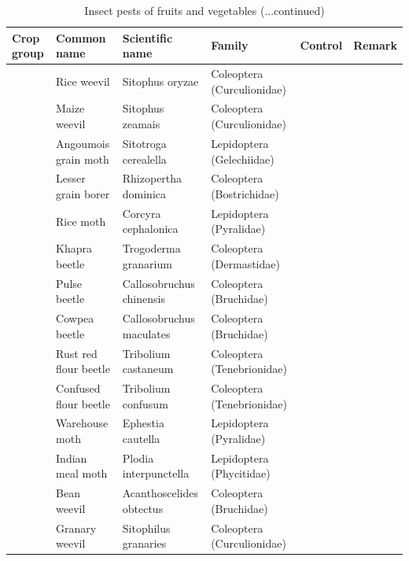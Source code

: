 \documentclass[10pt,dvipsnames,ignorenonframetext,aspectratio=169]{beamer}
\begin{document}
\begin{frame}{}
\protect\hypertarget{section-14}{}
\begin{table}

\caption{\label{tab:unnamed-chunk-2}Insect pests of fruits and vegetables (...continued)}
\centering
\fontsize{5}{7}\selectfont
\begin{tabular}[t]{>{\raggedright\arraybackslash}p{6em}>{\raggedright\arraybackslash}p{12em}>{\raggedright\arraybackslash}p{14em}>{\raggedright\arraybackslash}p{14em}>{\raggedright\arraybackslash}p{8em}>{\raggedright\arraybackslash}p{8em}}
\toprule
Crop group & Common name & Scientific name & Family & Control & Remark\\
\midrule
 & Rice weevil & Sitophus oryzae & Coleoptera (Curculionidae) &  & \\
\cmidrule{2-6}
 & Maize weevil & Sitophus zeamais & Coleoptera (Curculionidae) &  & \\
\cmidrule{2-6}
 & Angoumois grain moth & Sitotroga cerealella & Lepidoptera (Gelechiidae) &  & \\
\cmidrule{2-6}
 & Lesser grain borer & Rhizopertha dominica & Coleoptera (Bostrichidae) &  & \\
\cmidrule{2-6}
 & Rice moth & Corcyra cephalonica & Lepidoptera (Pyralidae) &  & \\
\cmidrule{2-6}
 & Khapra beetle & Trogoderma granarium & Coleoptera (Dermastidae) &  & \\
\cmidrule{2-6}
 & Pulse beetle & Callosobruchus chinensis & Coleoptera (Bruchidae) &  & \\
\cmidrule{2-6}
 & Cowpea beetle & Callosobruchus maculates & Coleoptera (Bruchidae) &  & \\
\cmidrule{2-6}
 & Rust red flour beetle & Tribolium castaneum & Coleoptera (Tenebrionidae) &  & \\
\cmidrule{2-6}
 & Confused flour beetle & Tribolium confusum & Coleoptera (Tenebrionidae) &  & \\
\cmidrule{2-6}
 & Warehouse moth & Ephestia cautella & Lepidoptera (Pyralidae) &  & \\
\cmidrule{2-6}
 & Indian meal moth & Plodia interpunctella & Lepidoptera (Phycitidae) &  & \\
\cmidrule{2-6}
 & Bean weevil & Acanthoscelides obtectus & Coleoptera (Bruchidae) &  & \\
\cmidrule{2-6}
\multirow{-14}{6em}{\raggedright\arraybackslash Storage pests} & Granary weevil & Sitophilus granaries & Coleoptera (Curculionidae) &  & \\
\bottomrule
\end{tabular}
\end{table}
\end{frame}
\end{document}
